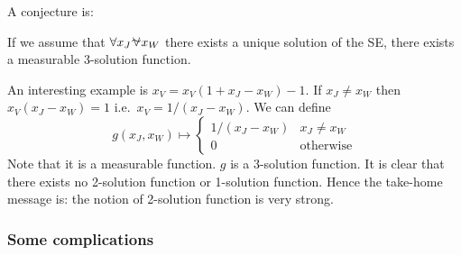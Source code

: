 A conjecture is:
\begin{Con}
  If we assume that $\forall x_J \foralmostall x_W$ there exists a unique solution of the SE, there exists a measurable 3-solution function.
\end{Con}
\begin{Eg}
  An interesting example is $x_V = x_V (1 + x_J - x_W) - 1$.
  If $x_J \ne x_W$ then $x_V (x_J - x_W) = 1$ i.e.\ $x_V = 1 / (x_J - x_W)$.
  We can define 
  $$g(x_J,x_W) \mapsto \begin{cases}
    1/(x_J - x_W) & x_J \ne x_W \\
    0             & \text{otherwise}
  \end{cases}$$
  Note that it is a measurable function.
  $g$ is a 3-solution function. 
  It is clear that there exists no 2-solution function or 1-solution function.
  Hence the take-home message is: the notion of 2-solution function is very strong.
\end{Eg}

\subsubsection{Some complications}\label{sec:complications_with_nullsets}

